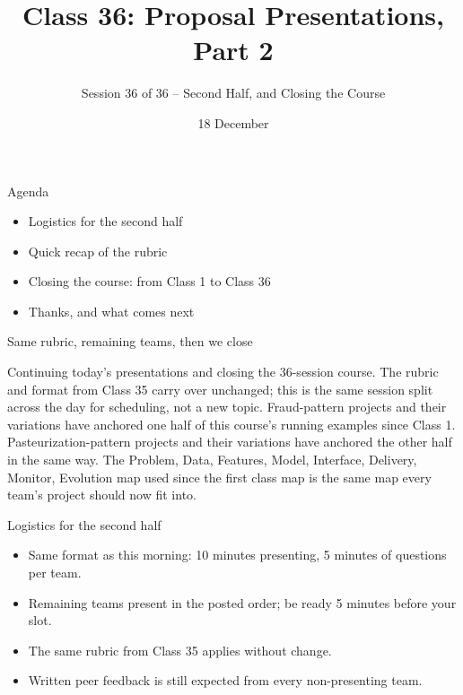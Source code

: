 

\title{Class 36: Proposal Presentations, Part 2}
\subtitle{Session 36 of 36 -- Second Half, and Closing the Course}
\author{\coursename}
\date{18 December}



\frame{\titlepage \coursefooter}

\begin{frame}{Agenda}
\begin{itemize}
\item Logistics for the second half
\item Quick recap of the rubric
\item Closing the course: from Class 1 to Class 36
\item Thanks, and what comes next
\end{itemize}
\coursefooter
\end{frame}

\begin{frame}{Same rubric, remaining teams, then we close}
\coursefooter
\end{frame}

\coursecontextframe
{Continuing today's presentations and closing the 36-session course.}
{The rubric and format from Class 35 carry over unchanged; this is the same session split across the day for scheduling, not a new topic.}
{Fraud-pattern projects and their variations have anchored one half of this course's running examples since Class 1.}
{Pasteurization-pattern projects and their variations have anchored the other half in the same way.}
{The Problem, Data, Features, Model, Interface, Delivery, Monitor, Evolution map used since the first class map is the same map every team's project should now fit into.}

\begin{frame}{Logistics for the second half}
\begin{itemize}
\item Same format as this morning: 10 minutes presenting, 5 minutes of questions per team.
\item Remaining teams present in the posted order; be ready 5 minutes before your slot.
\item The same rubric from Class 35 applies without change.
\item Written peer feedback is still expected from every non-presenting team.
\end{itemize}
\coursefooter
\end{frame}

